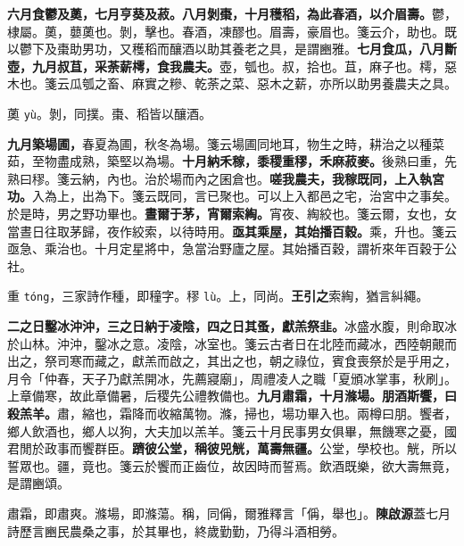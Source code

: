 \textbf{六月食鬱及薁，七月亨葵及菽。八月剝棗，十月穫稻，為此春酒，以介眉壽。}{\footnotesize 鬱，棣屬。薁，蘡薁也。剝，擊也。春酒，凍醪也。眉壽，豪眉也。箋云介，助也。既以鬱下及棗助男功，又穫稻而釀酒以助其養老之具，是謂豳雅。}\textbf{七月食瓜，八月斷壺，九月叔苴，采荼薪樗，食我農夫。}{\footnotesize 壺，瓠也。叔，拾也。苴，麻子也。樗，惡木也。箋云瓜瓠之畜、麻實之糝、乾荼之菜、惡木之薪，亦所以助男養農夫之具。}

\begin{quoting}薁 \texttt{yù}。剝，同撲。棗、稻皆以釀酒。\end{quoting}

\textbf{九月築場圃，}{\footnotesize 春夏為圃，秋冬為場。箋云場圃同地耳，物生之時，耕治之以種菜茹，至物盡成熟，築堅以為場。}\textbf{十月納禾稼，黍稷重穋，禾麻菽麥。}{\footnotesize 後熟曰重，先熟曰穋。箋云納，內也。治於場而內之囷倉也。}\textbf{嗟我農夫，我稼既同，上入執宮功。}{\footnotesize 入為上，出為下。箋云既同，言已聚也。可以上入都邑之宅，治宮中之事矣。於是時，男之野功畢也。}\textbf{晝爾于茅，宵爾索綯。}{\footnotesize 宵夜、綯絞也。箋云爾，女也，女當晝日往取茅歸，夜作絞索，以待時用。}\textbf{亟其乘屋，其始播百穀。}{\footnotesize 乘，升也。箋云亟急、乘治也。十月定星將中，急當治野廬之屋。其始播百穀，謂祈來年百穀于公社。}

\begin{quoting}重 \texttt{tóng}，三家詩作種，即穜字。穋 \texttt{lù}。上，同尚。\textbf{王引之}索綯，猶言糾繩。\end{quoting}

\textbf{二之日鑿冰沖沖，三之日納于凌陰，四之日其蚤，獻羔祭韭。}{\footnotesize 冰盛水腹，則命取冰於山林。沖沖，鑿冰之意。凌陰，冰室也。箋云古者日在北陸而藏冰，西陸朝覿而出之，祭司寒而藏之，獻羔而啟之，其出之也，朝之祿位，賓食喪祭於是乎用之，月令「仲春，天子乃獻羔開冰，先薦寢廟」，周禮凌人之職「夏頒冰掌事，秋刷」。上章備寒，故此章備暑，后稷先公禮教備也。}\textbf{九月肅霜，十月滌場。朋酒斯饗，曰殺羔羊。}{\footnotesize 肅，縮也，霜降而收縮萬物。滌，掃也，場功畢入也。兩樽曰朋。饗者，鄉人飲酒也，鄉人以狗，大夫加以羔羊。箋云十月民事男女俱畢，無饑寒之憂，國君閒於政事而饗群臣。}\textbf{躋彼公堂，稱彼兕觥，萬壽無疆。}{\footnotesize 公堂，學校也。觥，所以誓眾也。疆，竟也。箋云於饗而正齒位，故因時而誓焉。飲酒既樂，欲大壽無竟，是謂豳頌。}

\begin{quoting}肅霜，即肅爽。滌場，即滌蕩。稱，同偁，爾雅釋言「偁，舉也」。\textbf{陳啟源}蓋七月詩歷言豳民農桑之事，於其畢也，終歲勤勤，乃得斗酒相勞。\end{quoting}

